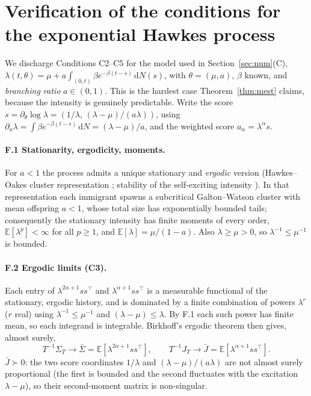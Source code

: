 \documentclass[11pt]{article}
\newcommand{\dd}{\,\mathrm{d}}
\newcommand{\E}{\mathbb{E}}
\begin{document}
\section{Verification of the conditions for the exponential Hawkes process}
\label{app:hawkes}
We discharge Conditions C2--C5 for the model used in Section~\ref{sec:num}(C),
$\lambda(t,\theta)=\mu+a\int_{(0,t)}\beta e^{-\beta(t-s)}\dd N(s)$, with
$\theta=(\mu,a)$, $\beta$ known, and \emph{branching ratio} $a\in(0,1)$. This is the
hardest case Theorem~\ref{thm:mest} claims, because the intensity is genuinely
predictable. Write the score $s=\partial_\theta\log\lambda=(1/\lambda,\,(\lambda-\mu)/(a\lambda))$,
using $\partial_a\lambda=\int\beta e^{-\beta(t-s)}\dd N=(\lambda-\mu)/a$, and the
weighted score $a_\alpha=\lambda^{\alpha}s$.

\paragraph{F.1 Stationarity, ergodicity, moments.}
For $a<1$ the process admits a unique stationary and \emph{ergodic} version
(Hawkes--Oakes cluster representation \citep{hawkes1974}; stability of the
self-exciting intensity \citep{bremaud1996}). In that representation each immigrant
spawns a subcritical Galton--Watson cluster with mean offspring $a<1$, whose total
size has exponentially bounded tails; consequently the stationary intensity has
finite moments of every order, $\E[\lambda^{p}]<\infty$ for all $p\ge1$, and
$\E[\lambda]=\mu/(1-a)$. Also $\lambda\ge\mu>0$, so $\lambda^{-1}\le\mu^{-1}$ is
bounded.

\paragraph{F.2 Ergodic limits (C3).}
Each entry of $\lambda^{2\alpha+1}ss^{\top}$ and $\lambda^{\alpha+1}ss^{\top}$ is a
measurable functional of the stationary, ergodic history, and is dominated by a
finite combination of powers $\lambda^{r}$ ($r$ real) using $\lambda^{-1}\le\mu^{-1}$
and $(\lambda-\mu)\le\lambda$. By F.1 each such power has finite mean, so each
integrand is integrable. Birkhoff's ergodic theorem then gives, almost surely,
\[
T^{-1}\Sigma_T\to\bar\Sigma=\E[\lambda^{2\alpha+1}ss^{\top}],\qquad
T^{-1}J_T\to\bar J=\E[\lambda^{\alpha+1}ss^{\top}].
\]
$\bar J\succ0$: the two score coordinates $1/\lambda$ and $(\lambda-\mu)/(a\lambda)$
are not almost surely proportional (the first is bounded and the second fluctuates
with the excitation $\lambda-\mu$), so their second-moment matrix is non-singular.
\end{document}
